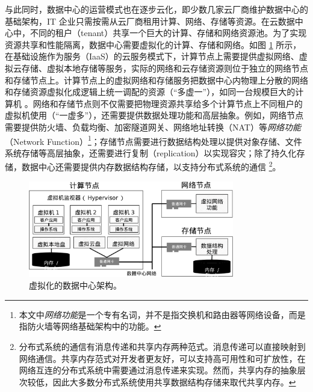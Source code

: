 与此同时，数据中心的运营模式也在逐步云化，即少数几家云厂商维护数据中心的基础架构，IT 企业只需按需从云厂商租用计算、网络、存储等资源。在云数据中心中，不同的租户（tenant）共享一个巨大的计算、存储和网络资源池。为了实现资源共享和性能隔离，数据中心需要虚拟化的计算、存储和网络。如图 \ref{intro:fig:virt-architecture} 所示，在基础设施作为服务（IaaS）的云服务模式下，计算节点上需要提供虚拟网络、虚拟云存储、虚拟本地存储等服务，实际的网络和云存储资源则位于独立的网络节点和存储节点上。计算节点上的虚拟网络和存储服务把数据中心内物理上分散的网络和存储资源虚拟化成逻辑上统一调配的资源（``多虚一''），如同一台规模巨大的计算机 \cite{barroso2018datacenter}。网络和存储节点则不仅需要把物理资源共享给多个计算节点上不同租户的虚拟机使用（``一虚多''），还需要提供数据处理功能和高层抽象。例如，网络节点需要提供防火墙、负载均衡、加密隧道网关、网络地址转换（NAT）等\textit{网络功能}（Network Function）\footnote{本文中\textit{网络功能}是一个专有名词，并不是指交换机和路由器等网络设备，而是指防火墙等网络基础架构中的功能。}；存储节点需要进行数据结构处理以提供对象存储、文件系统存储等高层抽象，还需要进行复制（replication）以实现容灾；除了持久化存储，数据中心还需要提供内存数据结构存储，以支持分布式系统的通信 \footnote{分布式系统的通信有消息传递和共享内存两种范式。消息传递可以直接映射到网络通信。共享内存范式对开发者更友好，可以支持高可用性和可扩放性，在网络互连的分布式系统中需要通过消息传递来实现。然而，共享内存的抽象层次较低，因此大多数分布式系统使用共享数据结构存储来取代共享内存。}。


\begin{figure}[htbp]
	\centering
	\includegraphics[width=0.8\textwidth]{figures/virt_arch.pdf}
	\caption{虚拟化的数据中心架构。}
	\label{intro:fig:virt-architecture}
\end{figure}


